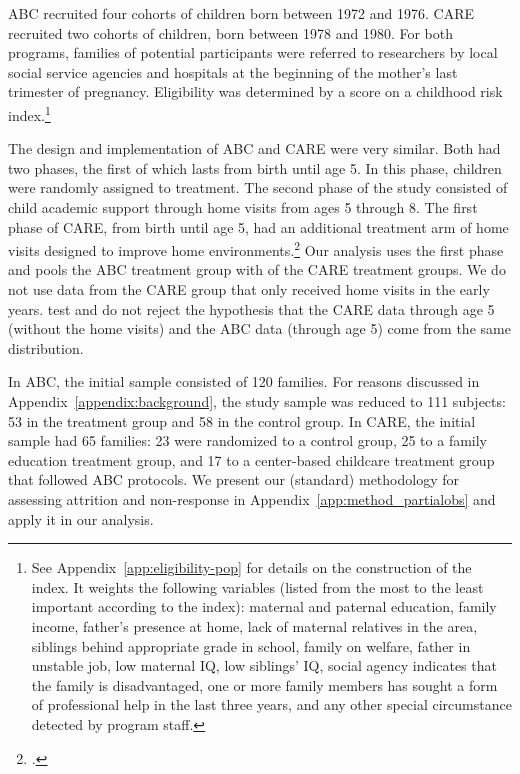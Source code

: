 ABC recruited four cohorts of children born between 1972 and 1976. CARE recruited two cohorts of children, born between 1978 and 1980. For both programs, families of potential participants were referred to researchers by local social service agencies and hospitals at the beginning of the mother's last trimester of pregnancy. Eligibility was determined by a score on a childhood risk index.\footnote{See  Appendix~\ref{app:eligibility-pop} for details on the construction of the index. It weights the following variables (listed from the most to the least important according to the index): maternal and paternal education, family income, father's presence at home, lack of maternal relatives in the area, siblings behind appropriate grade in school, family on welfare, father in unstable job, low maternal IQ, low siblings' IQ, social agency indicates that the family is disadvantaged, one or more family members has sought a form of professional help in the last three years, and any other special circumstance detected by program staff.}

The design and implementation of ABC and CARE were very similar. Both had two phases, the first of which lasts from birth until age 5. In this phase, children were randomly assigned to treatment. The second phase of the study consisted of child academic support through home visits from ages 5 through 8. The first phase of CARE, from birth until age 5, had an additional treatment arm of home visits designed to improve home environments.\footnote{\citet{Wasik_Ramey_etal_1990_CD}.} Our analysis uses the first phase and pools the ABC treatment group with of the CARE treatment groups. We do not use data from the CARE group that only received home visits in the early years. \cite{Campbell_Conti_etal_2014_EarlyChildhoodInvestments} test and do not reject the hypothesis that the CARE data through age 5 (without the home visits) and the ABC data (through age 5) come from the same distribution. 

In ABC, the initial sample consisted of 120 families. For reasons discussed in Appendix~\ref{appendix:background}, the study sample was reduced to 111 subjects: 53 in the treatment group and 58 in the control group. In CARE, the initial sample had 65 families: 23 were randomized to a control group, 25 to a family education treatment group, and 17 to a center-based childcare treatment group that followed ABC protocols. We present our (standard) methodology for assessing attrition and non-response in Appendix~\ref{app:method_partialobs} and apply it in our analysis.

